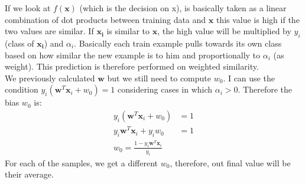 If we look at $f(\pmb{x})$ (which is the decision on x), is basically taken as a
linear combination of dot products between training data and $\pmb{x}$ this value
is high if the two values are similar. If $\pmb{x_i}$ is similar to $\pmb{x}$, the
high value will be multiplied by $y_{i}$ (class of $\pmb{x_i}$) and $\alpha_{i}$.
Basically each train example pulls towards its own class based on how similar
the new example is to him and proportionally to $\alpha_{i}$ (as weight). This prediction
is therefore performed on weighted similarity.\\

We previously calculated $\pmb{w}$ but we still need to compute $w_{0}$. I can use
the condition $y_{i}(\pmb{w}^{T}\pmb{x}_{i}+ w_{0}) = 1$ considering cases in which
$\alpha_{i}> 0$. Therefore the bias $w_{0}$ is:
\begin{align*}
	y_{i}(\pmb{w}^{T}\pmb{x}_{i}+ w_{0})                & = 1 \\
	y_{i}\pmb{w}^{T}\pmb{x}_{i}+ y_{i}w_{0}             & = 1 \\
	w_{0}= \frac{1 - y_{i}\pmb{w}^{T}\pmb{x}_{i}}{y_{i}}
\end{align*}
For each of the samples, we get a different $w_{0}$, therefore, out final value
will be their average.

